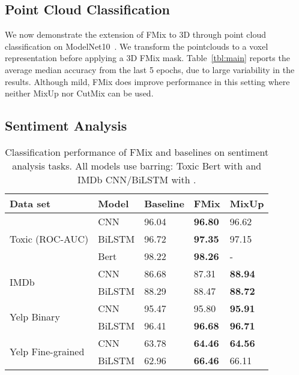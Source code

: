 \documentclass[journal]{IEEEtran}
\newcommand{\fmix}{FMix\xspace}
\newcommand{\mixup}{MixUp\xspace}
\newcommand{\cutmix}{CutMix\xspace}
\begin{document}
\subsection{Point Cloud Classification}
We now demonstrate the extension of \fmix to 3D through point cloud classification on ModelNet10~\citep{modelnet10}.
We transform the pointclouds to a voxel representation before applying a 3D \fmix mask. Table~\ref{tbl:main} reports the average median accuracy from the last 5 epochs, due to large variability in the results. Although mild, \fmix does improve performance in this setting where neither \mixup nor \cutmix can be used.

\subsection{Sentiment Analysis}
\begin{table}[t]
\centering
\caption{Classification performance of \fmix and baselines on sentiment analysis tasks. All models use  barring: Toxic Bert with  and IMDb CNN/BiLSTM with .}\label{tbl:nlp}
\begin{tabularx}{\linewidth}{lXXXX}
    \toprule
    Data set &  Model & Baseline & \fmix & \mixup \\
    \midrule
    \multirow{3}{*}{Toxic (ROC-AUC)} & CNN & 96.04 & \textbf{96.80} & 96.62\\
    & BiLSTM & 96.72 & \textbf{97.35} & 97.15\\
    & Bert & 98.22 & \textbf{98.26} &  -\\
    \cmidrule(lr){1-5}
    \multirow{2}{*}{IMDb} & CNN & 86.68 & 87.31 & \textbf{88.94}\\
    & BiLSTM & 88.29 & 88.47 & \textbf{88.72}\\
    \cmidrule(lr){1-5}
    \multirow{2}{*}{Yelp Binary} & CNN & 95.47 & 95.80 & \textbf{95.91}\\
    & BiLSTM & 96.41 & \textbf{96.68} & \textbf{96.71}\\
    \cmidrule(lr){1-5}
    \multirow{2}{*}{Yelp Fine-grained} & CNN & 63.78 & \textbf{64.46} & \textbf{64.56}\\
    & BiLSTM & 62.96 & \textbf{66.46} & 66.11\\
    \bottomrule
\end{tabularx}
\end{table}
\end{document}
